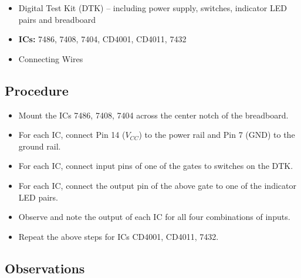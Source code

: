 \documentclass[11pt, a4paper]{article}
\begin{document}
\begin{itemize}
    \item Digital Test Kit (DTK) -- including power supply, switches, indicator LED pairs and breadboard
    \item \textbf{ICs:} 7486, 7408, 7404, CD4001, CD4011, 7432
    \item Connecting Wires
\end{itemize}

\subsection{Procedure}

\begin{itemize}
    \item Mount the ICs 7486, 7408, 7404 across the center notch of the breadboard.
    \item For each IC, connect Pin 14 ($V_{CC}$) to the power rail and Pin 7 ($\text{GND}$) to the ground rail.
    \item For each IC, connect input pins of one of the gates to switches on the DTK.
    \item For each IC, connect the output pin of the above gate to one of the indicator LED pairs.
    \item Observe and note the output of each IC for all four combinations of inputs.
    \item Repeat the above steps for ICs CD4001, CD4011, 7432.
\end{itemize}

\subsection{Observations}
\end{document}
